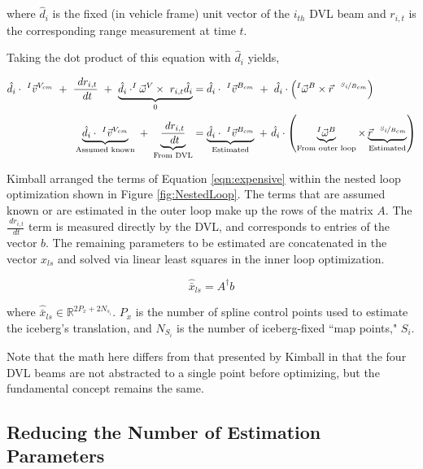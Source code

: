 where $\hat{d}_{i} $ is the fixed (in vehicle frame) unit vector of the $i_{th}$ DVL beam and $r_{i,t} $ is the corresponding range measurement at time $t$.  

Taking the dot product of this equation with $\hat{d}_{i} $ yields,

    \begin{align}
    \hat{d}_{i} \cdot~^{I}\vec{v}^{V_{cm}} ~+~ \frac{~dr_{i,t}}{~dt}  ~+~ \underbrace{\hat{d}_{i} \cdot^{I}\vec{\omega}^{V}\times{~r_{i,t}\hat{d}_{i}}}_{0}  &=
     \label{eqn:expensive}
    \hat{d}_{i} \cdot~^{I}\vec{v}^{B_{cm}} ~ + ~\hat{d}_{i} \cdot\left(^{I}\vec{\omega}^{B}\times\vec{r}^{~~\nicefrac{S_i}{B_{cm}}}\right)  \\
    \underbrace{\hat{d}_{i} \cdot~^{I}\vec{v}^{V_{cm}}}_{\text{Assumed known}} ~+~ \underbrace{\frac{~dr_{i,t}}{~dt} }_{\text{From DVL}}  &=
    \underbrace{\hat{d}_{i} \cdot~^{I}\vec{v}^{B_{cm}}}_{\text{Estimated}} ~ + ~\hat{d}_{i} \cdot\left(\underbrace{^{I}\vec{\omega}^{B}}_{\text{From outer loop}}\times\underbrace{\vec{r}^{~~\nicefrac{S_i}{B_{cm}}}}_{\text{Estimated}}\right)  
         \label{eqn:expensive2}
\end{align}

Kimball arranged the terms of Equation \ref{eqn:expensive} within the nested loop optimization shown in Figure \ref{fig:NestedLoop}. The terms that are assumed known or are estimated in the outer loop make up the rows of the matrix $A$. The $\frac{~dr_{i,t}}{~dt}$ term is measured directly by the DVL, and corresponds to entries of the vector $b$. The remaining parameters to be estimated are concatenated in the vector $x_{ls}$ and solved via linear least squares in the inner loop optimization. 

\begin{equation}
    \hat{\bar{x}}_{ls} = A^{\dagger} b
    \label{eqn:LeastSquares}
\end{equation}

where $\hat{\bar{x}}_{ls}  \in \mathbb{R}^{ 2P_x + 2N_{s_i}}$. $P_x$ is the number of spline control points used to estimate the iceberg's translation, and $N_{S_i}$ is the number of iceberg-fixed ``map points," $S_i$.


Note that the math here differs from that presented by Kimball in that the four DVL beams are not abstracted to a single point before optimizing, but the fundamental concept remains the same.



\subsection{Reducing the Number of Estimation Parameters}

